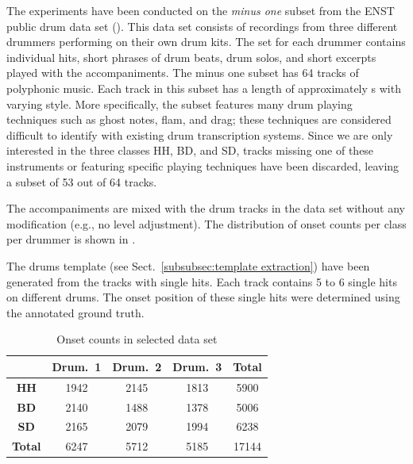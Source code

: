 \documentclass{article}
\begin{document}
The experiments have been conducted on the \textit{minus one} subset from the ENST public drum data set (\cite{Gillet2006}). This data set consists of recordings from three different drummers performing on their own drum kits. The set for each drummer contains individual hits, short phrases of drum beats, drum solos, and short excerpts played with the accompaniments. The minus one subset has 64 tracks of polyphonic music. Each track in this subset has a length of approximately \unit[70]{s} with varying style. More specifically, the subset features many drum playing techniques such as ghost notes, flam, and drag; these techniques are considered difficult to identify with existing drum transcription systems. Since we are only interested in the three classes HH, BD, and SD, tracks missing one of these instruments or featuring specific playing techniques have been discarded, leaving a subset of 53 out of 64 tracks.

The accompaniments are mixed with the drum tracks in the data set without any modification (e.g., no level adjustment). The distribution of onset counts per class per drummer is shown in . %

The drums template (see Sect.~\ref{subsubsec:template extraction}) have been generated from the tracks with single hits. Each track contains 5 to 6 single hits on different drums. The onset position of these single hits were determined using the annotated ground truth. 
 
\begin{table}[h]
\begin{center}
\begin{tabular}{|c|c|c|c|c|}
\hline
 & \textbf{Drum.~1}    & \textbf{Drum.~2}    & \textbf{Drum.~3}    & \textbf{Total} \\ \hline
\textbf{HH}        & 1942 & 2145 & 1813 & 5900  \\ \hline
\textbf{BD}        & 2140 & 1488 & 1378 & 5006  \\ \hline
\textbf{SD}        & 2165 & 2079 & 1994 & 6238  \\ \hline
\textbf{Total}     & 6247 & 5712 & 5185 & 17144 \\ \hline
\end{tabular}
 \caption{Onset counts in selected data set}%
 \label{tab:onsetCount}
\end{center}
\end{table}
\end{document}
